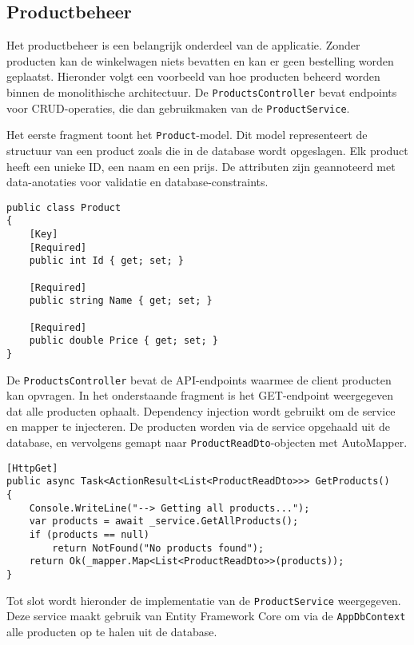 \subsection{Productbeheer}

Het productbeheer is een belangrijk onderdeel van de applicatie. Zonder producten kan de winkelwagen niets bevatten en kan er geen bestelling worden geplaatst. Hieronder volgt een voorbeeld van hoe producten beheerd worden binnen de monolithische architectuur. De \texttt{ProductsController} bevat endpoints voor CRUD-operaties, die dan gebruikmaken van de \texttt{ProductService}.

\medskip
Het eerste fragment toont het \texttt{Product}-model. Dit model representeert de structuur van een product zoals die in de database wordt opgeslagen. Elk product heeft een unieke ID, een naam en een prijs. De attributen zijn geannoteerd met data-anotaties voor validatie en database-constraints.
\medskip

\begin{lstlisting}[style=mystyleA, caption=Product.cs, label=lst:MonoProductModel]
public class Product
{
	[Key]
	[Required]
	public int Id { get; set; }
	
	[Required]
	public string Name { get; set; }
	
	[Required]
	public double Price { get; set; }
}
\end{lstlisting}

\medskip
De \texttt{ProductsController} bevat de API-endpoints waarmee de client producten kan opvragen. In het onderstaande fragment is het GET-endpoint weergegeven dat alle producten ophaalt. Dependency injection wordt gebruikt om de service en mapper te injecteren. De producten worden via de service opgehaald uit de database, en vervolgens gemapt naar \texttt{ProductReadDto}-objecten met AutoMapper.
\medskip

\begin{lstlisting}[style=mystyleA, caption=ProductsController.cs (fragment), label=lst:MonoProductsController]
[HttpGet]
public async Task<ActionResult<List<ProductReadDto>>> GetProducts()
{
	Console.WriteLine("--> Getting all products...");
	var products = await _service.GetAllProducts();
	if (products == null)
		return NotFound("No products found");
	return Ok(_mapper.Map<List<ProductReadDto>>(products));
}
\end{lstlisting}

\medskip
Tot slot wordt hieronder de implementatie van de \texttt{ProductService} weergegeven. Deze service maakt gebruik van Entity Framework Core om via de \texttt{AppDbContext} alle producten op te halen uit de database.
\medskip

